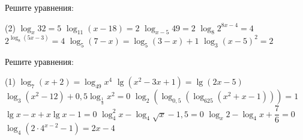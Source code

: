 \begin{class}[number=3]
	\begin{listofex}
		\item Решите уравнения:
		\begin{tasks}(2)
			\task \( \log_x 32 =5 \)
			\task \( \log_{11} (x-18) = 2 \)
			\task \( \log_{x-5}49=2 \)
			\task \( \log_8 2^{8x-4}=4 \)
			\task \( 2^{\log_8 (5x-3)}=4 \)
			\task \( \log_5(7-x)=\log_5(3-x)+1 \)
			\task \( \log_3 (x-5)^2 = 2 \)
		\end{tasks}
		
		\item Решите уравнения: %
		\begin{tasks}(1)
			\task \( \log_7(x+2)=\log_{49}x^4 \)
			\task \( \lg (x^2-3x+1)= \lg (2x-5) \)
			\task \( \log_3 (x^2-12)+ 0,5 \log_{\tfrac{1}{3}} x^2 = 0 \)
			\task \( \log_2 (\log_{0,5} (\log_{625} (x^2+x-1) ) )=1 \)
			\task \( \lg x - x + x \lg x -1 =0 \)
			\task \( \log_4^2x - \log_4 \sqrt{x} - 1,5 = 0 \)
			\task \( \log_x 2 - \log_4 x + \dfrac{7}{6} = 0 \)
			\task \( \log_4 (2 \cdot 4^{x-2}-1)=2x-4 \)
		\end{tasks}
		
		
		
	\end{listofex}
\end{class}

